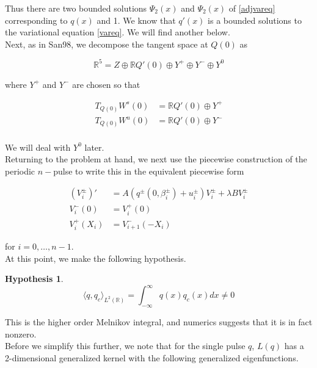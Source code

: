 \documentclass[12pt]{article}
\def\R{{\mathbb R}}
\newtheorem{hypothesis}{Hypothesis}
\begin{document}
Thus there are two bounded solutions $\Psi_2(x)$ and $\Psi_2(x)$ of \eqref{adjvareq} corresponding to $q(x)$ and 1. We know that $q'(x)$ is a bounded solutions to the variational equation \eqref{vareq}. We will find another below.\\

Next, as in San98, we decompose the tangent space at $Q(0)$ as

\begin{equation}
\R^5 = Z \oplus \R Q'(0) \oplus Y^+ \oplus Y^- \oplus Y^0
\end{equation}

where $Y^+$ and $Y^-$ are chosen so that

\begin{align*}
T_{Q(0)} W^s(0) &= \R Q'(0) \oplus Y^+ \\
T_{Q(0)} W^u(0) &= \R Q'(0) \oplus Y^- \\
\end{align*}

We will deal with $Y^0$ later.\\

Returning to the problem at hand, we next use the piecewise construction of the periodic $n-$pulse to write this in the equivalent piecewise form

\begin{align*}
(V_i^\pm)' &= A( q^\pm(0, \beta_i^\pm) + u_i^\pm) V_i^\pm + \lambda B V_i^\pm \\
V_i^-(0) &= V_i^+(0) \\
V_i^+(X_i) &= V_{i+1}^-(-X_i) 
\end{align*}

for $i = 0, \dots, n-1$. \\

At this point, we make the following hypothesis.

\begin{hypothesis}\label{higherMelnikov}
\begin{equation}\label{higherMelnikovnonzero}
\langle q, q_c \rangle_{L^2(\R)} = \int_{-\infty}^\infty q(x) q_c(x) dx \neq 0
\end{equation}
\end{hypothesis}

This is the higher order Melnikov integral, and numerics suggests that it is in fact nonzero.\\

Before we simplify this further, we note that for the single pulse $q$, $L(q)$ has a 2-dimensional generalized kernel with the following generalized eigenfunctions.
\end{document}
